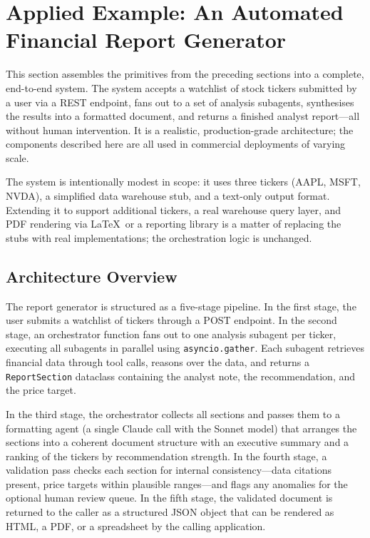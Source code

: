\section{Applied Example: An Automated Financial Report Generator}
\label{app:sdk-commercial:example}

This section assembles the primitives from the preceding sections into a complete,
end-to-end system. The system accepts a watchlist of stock tickers submitted by a user
via a REST endpoint, fans out to a set of analysis subagents, synthesises the results
into a formatted document, and returns a finished analyst report---all without human
intervention. It is a realistic, production-grade architecture; the components
described here are all used in commercial deployments of varying scale.

The system is intentionally modest in scope: it uses three tickers (AAPL, MSFT, NVDA),
a simplified data warehouse stub, and a text-only output format. Extending it to
support additional tickers, a real warehouse query layer, and PDF rendering via
\LaTeX\ or a reporting library is a matter of replacing the stubs with real
implementations; the orchestration logic is unchanged.

\subsection{Architecture Overview}
\label{app:sdk-commercial:example:arch}

The report generator is structured as a five-stage pipeline. In the first stage, the
user submits a watchlist of tickers through a POST endpoint. In the second stage, an
orchestrator function fans out to one analysis subagent per ticker, executing all
subagents in parallel using \texttt{asyncio.gather}. Each subagent retrieves financial
data through tool calls, reasons over the data, and returns a \texttt{ReportSection}
dataclass containing the analyst note, the recommendation, and the price target.

In the third stage, the orchestrator collects all sections and passes them to a
formatting agent (a single Claude call with the Sonnet model) that arranges the
sections into a coherent document structure with an executive summary and a ranking of
the tickers by recommendation strength. In the fourth stage, a validation pass
checks each section for internal consistency---data citations present, price targets
within plausible ranges---and flags any anomalies for the optional human review queue.
In the fifth stage, the validated document is returned to the caller as a structured
JSON object that can be rendered as HTML, a PDF, or a spreadsheet by the calling
application.

